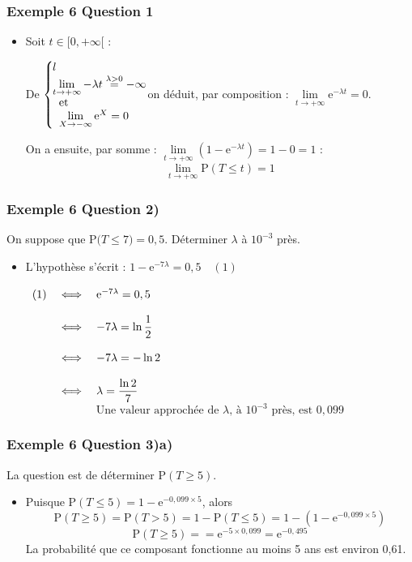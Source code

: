 \documentclass[xcolor=svgnames,t,final]{beamer}
\newcommand{\proba}[1]{\text{P}\big(#1\big)}
\newcommand{\sys}[2]{
\left\lbrace
 \begin{array}{l}
  \negthickspace\negthickspace #1\\
  \negthickspace\negthickspace #2\\
 \end{array}
\right.\negthickspace\negthickspace}
\begin{document}
\begin{frame}


\frametitle{Exemple 6 Question 1}


\begin{itemize}
\pause \item Soit $t\in[0,+\infty[$ :

De $\sys{l}{\lim\limits_{t\to +\infty}-\lambda t\overset{\lambda >0}{=}-\infty\\ \text{et}\\ \lim\limits_{X\to -\infty}\text{e}^X=0}$on déduit, par composition : 
$\lim\limits_{t\to +\infty}\text{e}^{-\lambda t}=0$.

On a ensuite, par somme : $\lim\limits_{t\to +\infty}(1-\text{e}^{-\lambda t})=1-0=1$ :	
\[\lim\limits_{t\to +\infty}\text{P}(T\leqslant t)=1\]	

\end{itemize}


\end{frame}



\begin{frame}


\frametitle{Exemple 6 Question 2)}
On suppose que $\proba{T \leqslant 7}=0,5$. Déterminer $\lambda$ à $10^{-3}$ près.

\begin{itemize}
\pause \item L'hypothèse s'écrit : $1-\text{e}^{-7\lambda}=0,5\quad (1)$

$\begin{array}[t]{lcl}
(1)&\iff&\text{e}^{-7\lambda}=0,5\\
&&\\
&\iff&-7\lambda=\ln \dfrac{1}{2} \\
&&\\
&\iff&-7\lambda=-\ln 2 \\
&&\\
&\iff&\lambda=\dfrac{\ln 2}{7}
\end{array}$
\[\text{Une valeur approchée de }\lambda\text{, à  }10^{-3}\text{ près, est } 0,099\]

\end{itemize}


\end{frame}


\begin{frame}


\frametitle{Exemple 6 Question 3)a)}

La question est de déterminer P$(T\geqslant 5)$.


\begin{itemize}
\pause \item 
Puisque P$(T\leqslant 5)=1-\text{e}^{-0,099\times 5}$, alors 
\[\text{P} (T\geqslant 5)=\text{P}(T>5)=1-\text{P}(T\leqslant 5)=1-(1-\text{e}^{-0,099\times 5})\]
\[\text{P} (T\geqslant 5)==\text{e}^{-5\times 0,099}=\text{e}^{-0,495}\]		
La probabilité que ce composant fonctionne au moins 5 ans est environ  0,61.


\end{itemize}


\end{frame}
\end{document}
